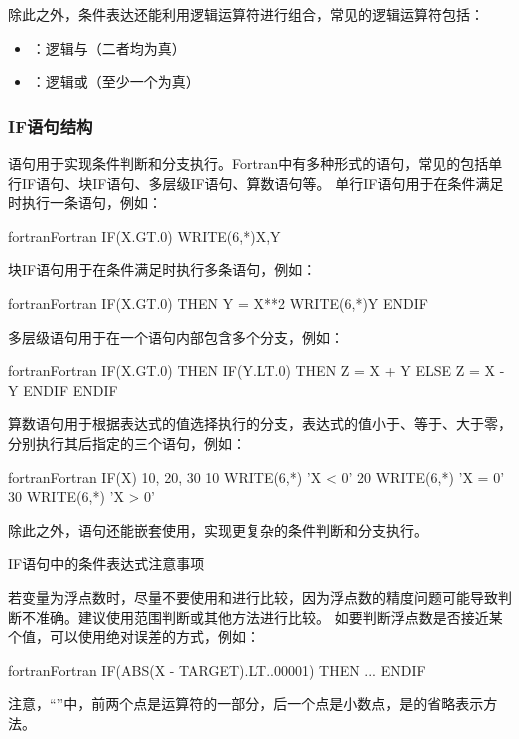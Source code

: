 除此之外，条件表达还能利用逻辑运算符进行组合，常见的逻辑运算符包括：
\begin{itemize}
    \item {}：逻辑与（二者均为真）
    \item {}：逻辑或（至少一个为真）
\end{itemize}

\subsubsection{IF语句结构}
语句用于实现条件判断和分支执行。Fortran中有多种形式的语句，常见的包括单行IF语句、块IF语句、多层级IF语句、算数语句等。
单行IF语句用于在条件满足时执行一条语句，例如：
\begin{envcode}{fortran}{Fortran}
      IF(X.GT.0) WRITE(6,*)X,Y
\end{envcode}

块IF语句用于在条件满足时执行多条语句，例如：
\begin{envcode}{fortran}{Fortran}
      IF(X.GT.0) THEN
          Y = X**2
          WRITE(6,*)Y
      ENDIF
\end{envcode}

多层级语句用于在一个语句内部包含多个分支，例如：
\begin{envcode}{fortran}{Fortran}
      IF(X.GT.0) THEN
          IF(Y.LT.0) THEN
              Z = X + Y
          ELSE
              Z = X - Y
          ENDIF
      ENDIF
\end{envcode}

算数语句用于根据表达式的值选择执行的分支，表达式的值小于、等于、大于零，分别执行其后指定的三个语句，例如：
\begin{envcode}{fortran}{Fortran}
      IF(X) 10, 20, 30
10    WRITE(6,*) 'X < 0'
20    WRITE(6,*) 'X = 0'
30    WRITE(6,*) 'X > 0'
\end{envcode}

除此之外，语句还能嵌套使用，实现更复杂的条件判断和分支执行。

\begin{zy}
IF语句中的条件表达式注意事项

若变量为浮点数时，尽量不要使用和进行比较，因为浮点数的精度问题可能导致判断不准确。建议使用范围判断或其他方法进行比较。
如要判断浮点数是否接近某个值，可以使用绝对误差的方式，例如：
\begin{envcode}{fortran}{Fortran}
      IF(ABS(X - TARGET).LT..00001) THEN
          ...
      ENDIF
\end{envcode}

注意，“”中，前两个点是运算符的一部分，后一个点是小数点，是的省略表示方法。
\end{zy}

